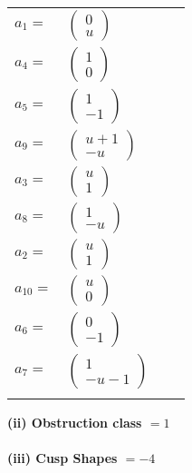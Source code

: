 \documentclass[1p]{elsarticle_modified}
\theoremstyle{definition}
\begin{document}
\begin{tabular}{m{7pt} m{180pt} m{7pt} m{180pt} }
\flushright $a_{1}=$&$\begin{pmatrix}0\\u\end{pmatrix}$ \\
\flushright $a_{4}=$&$\begin{pmatrix}1\\0\end{pmatrix}$ \\
\flushright $a_{5}=$&$\begin{pmatrix}1\\-1\end{pmatrix}$ \\
\flushright $a_{9}=$&$\begin{pmatrix}u+1\\- u\end{pmatrix}$ \\
\flushright $a_{3}=$&$\begin{pmatrix}u\\1\end{pmatrix}$ \\
\flushright $a_{8}=$&$\begin{pmatrix}1\\- u\end{pmatrix}$ \\
\flushright $a_{2}=$&$\begin{pmatrix}u\\1\end{pmatrix}$ \\
\flushright $a_{10}=$&$\begin{pmatrix}u\\0\end{pmatrix}$ \\
\flushright $a_{6}=$&$\begin{pmatrix}0\\-1\end{pmatrix}$ \\
\flushright $a_{7}=$&$\begin{pmatrix}1\\- u-1\end{pmatrix}$\\&\end{tabular}
\flushleft \textbf{(ii) Obstruction class $= 1$}\\~\\
\flushleft \textbf{(iii) Cusp Shapes $= -4$}\\~\\
\end{document}
